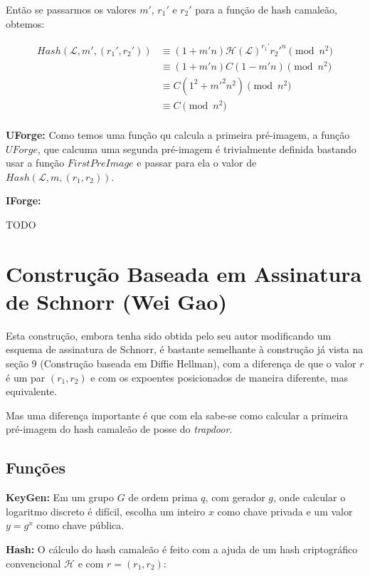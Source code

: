 \documentclass[a4paper]{article}
\begin{document}
Então se passarmos os valores $m'$, $r_1'$ e $r_2'$ para a função de
hash camaleão, obtemos:

\begin{equation}
\begin{split}
  Hash(\mathcal{L}, m', (r_1', r_2')) &\equiv (1+m'n)\mathcal{H}(\mathcal{L})^{r_1'}r_2'^n \pmod{n^2}\\
  &\equiv (1+m'n)C(1-m'n) \pmod{n^2}\\
  &\equiv C(1^2+m'^2n^2) \pmod{n^2}\\
  &\equiv C \pmod{n^2}\\
\end{split}
\end{equation}

\textbf{UForge:} Como temos uma função qu calcula a primeira
pré-imagem, a função $UForge$, que calcuma uma segunda pré-imagem é
trivialmente definida bastando usar a função $FirstPreImage$ e passar
para ela o valor de $Hash(\mathcal{L}, m, (r_1, r_2))$.

\textbf{IForge: }

TODO

\section{Construção Baseada em Assinatura de Schnorr (Wei Gao) \cite{wei}}

Esta construção, embora tenha sido obtida pelo seu autor modificando
um esquema de assinatura de Schnorr, é bastante semelhante à
construção já vista na seção 9 (Construção baseada em Diffie Hellman),
com a diferença de que o valor $r$ é um par $(r_1, r_2)$ e com os
expoentes posicionados de maneira diferente, mas equivalente.

Mas uma diferença importante é que com ela sabe-se como calcular a
primeira pré-imagem do hash camaleão de posse do \textit{trapdoor}.

\subsection{Funções}

\textbf{KeyGen: } Em um grupo $G$ de ordem prima $q$, com gerador
$g$, onde calcular o logaritmo discreto é difícil, escolha um inteiro
$x$ como chave privada e um valor $y=g^x$ como chave pública.

\textbf{Hash: } O cálculo do hash camaleão é feito com a ajuda de um
hash criptográfico convencional $\mathcal{H}$ e com $r=(r_1, r_2)$:
\end{document}
